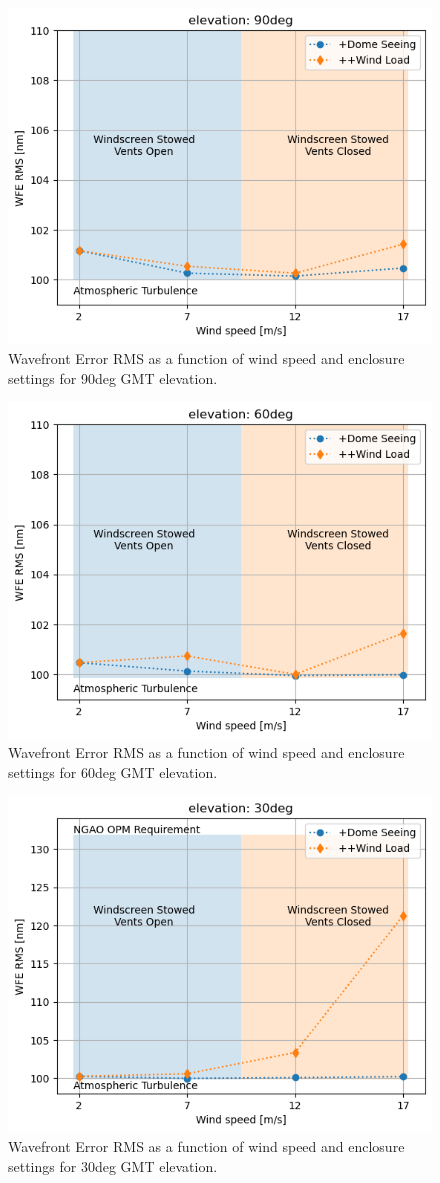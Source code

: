 \documentclass[]{AO4ELT}  %
\begin{document}
\begin{figure}
   \centering
      \includegraphics[width=0.5\linewidth]{wfe-rms_el90.png}
   \caption{Wavefront Error RMS as a function of wind speed and enclosure settings for 90deg GMT elevation.}
   \label{fig:18a}
\end{figure}

\begin{figure}
   \centering
      \includegraphics[width=0.5\linewidth]{wfe-rms_el60.png} 
   \caption{Wavefront Error RMS as a function of wind speed and enclosure settings for 60deg GMT elevation.}
   \label{fig:18b}
\end{figure}

\begin{figure}
   \centering
      \includegraphics[width=0.5\linewidth]{wfe-rms_el30.png}
   \caption{Wavefront Error RMS as a function of wind speed and enclosure settings for 30deg GMT elevation.}
   \label{fig:18c}
\end{figure}
\end{document}
